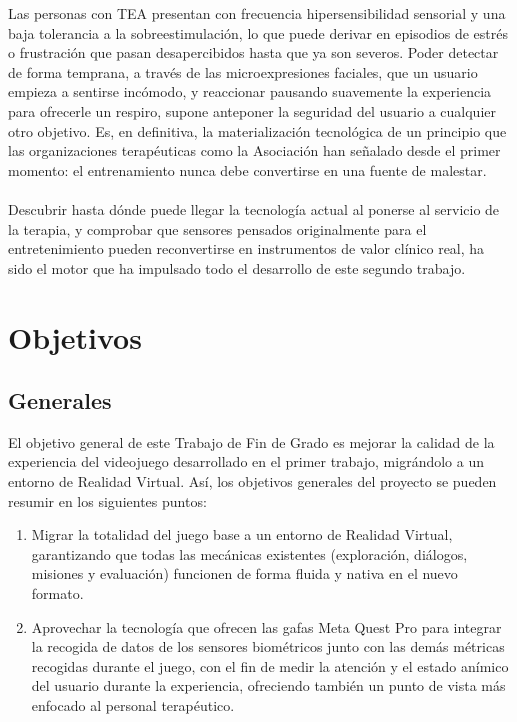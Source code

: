 \documentclass[12pt,twoside,titlepage]{report}
\begin{document}
Las personas con TEA presentan con frecuencia hipersensibilidad sensorial y una baja tolerancia a la sobreestimulación, lo que puede derivar en episodios de estrés o frustración que pasan desapercibidos hasta que ya son severos.
Poder detectar de forma temprana, a través de las microexpresiones faciales, que un usuario empieza a sentirse incómodo, y reaccionar pausando suavemente la experiencia para ofrecerle un respiro, supone anteponer la seguridad del usuario a cualquier otro objetivo.
Es, en definitiva, la materialización tecnológica de un principio que las organizaciones terapéuticas como la Asociación han señalado desde el primer momento: el entrenamiento nunca debe convertirse en una fuente de malestar.\\
\\
Descubrir hasta dónde puede llegar la tecnología actual al ponerse al servicio de la terapia, y comprobar que sensores pensados originalmente para el entretenimiento pueden reconvertirse en instrumentos de valor clínico real, ha sido el motor que ha impulsado todo el desarrollo de este segundo trabajo.

\section{Objetivos}

\subsection{Generales}

El objetivo general de este Trabajo de Fin de Grado es mejorar la calidad de la experiencia del videojuego desarrollado en el primer trabajo, migrándolo a un entorno de Realidad Virtual. Así, los objetivos generales del proyecto se pueden resumir en los siguientes puntos:

\begin{enumerate}[label=\textbf{\arabic*.}, leftmargin=1.5cm, itemsep=0.4em]
  \item Migrar la totalidad del juego base a un entorno de Realidad Virtual, garantizando que todas las mecánicas existentes (exploración, diálogos, misiones y evaluación) funcionen de forma fluida y nativa en el nuevo formato.
  \item Aprovechar la tecnología que ofrecen las gafas Meta Quest Pro para integrar la recogida de datos de los sensores biométricos junto con las demás métricas recogidas durante el juego, con el fin de medir la atención y el estado anímico del usuario durante la experiencia, ofreciendo también un punto de vista más enfocado al personal terapéutico.
\end{enumerate}
\end{document}
